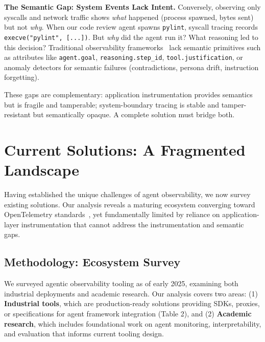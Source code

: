 \documentclass[sigplan,screen,9pt]{acmart}
\begin{document}
\textbf{The Semantic Gap: System Events Lack Intent.} Conversely, observing only syscalls and network traffic shows \emph{what} happened (process spawned, bytes sent) but not \emph{why}. When our code review agent spawns \texttt{pylint}, syscall tracing records \texttt{execve("pylint", [...])}. But \emph{why} did the agent run it? What reasoning led to this decision? Traditional observability frameworks~\cite{sigelman2010dapper,majors2017observability} lack semantic primitives such as attributes like \texttt{agent.goal}, \texttt{reasoning.step\_id}, \texttt{tool.justification}, or anomaly detectors for semantic failures (contradictions, persona drift, instruction forgetting).

These gaps are complementary: application instrumentation provides semantics but is fragile and tamperable; system-boundary tracing is stable and tamper-resistant but semantically opaque. A complete solution must bridge both.

\section{Current Solutions: A Fragmented Landscape}

Having established the unique challenges of agent observability, we now survey existing solutions. Our analysis reveals a maturing ecosystem converging toward OpenTelemetry standards~\cite{otelgenai,Liu2025OTel}, yet fundamentally limited by reliance on application-layer instrumentation that cannot address the instrumentation and semantic gaps.

\subsection{Methodology: Ecosystem Survey}

We surveyed agentic observability tooling as of early 2025, examining both industrial deployments and academic research. Our analysis covers two areas: (1) \textbf{Industrial tools}, which are production-ready solutions providing SDKs, proxies, or specifications for agent framework integration (Table 2), and (2) \textbf{Academic research}, which includes foundational work on agent monitoring, interpretability, and evaluation that informs current tooling design.
\end{document}

